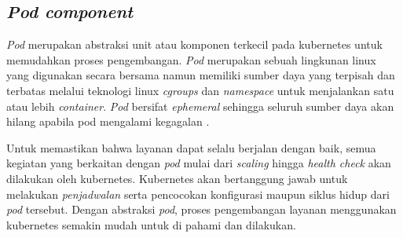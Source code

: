 \subsection{\textit{Pod component}}

\textit{Pod} merupakan abstraksi unit atau komponen terkecil pada kubernetes untuk memudahkan proses pengembangan. \textit{Pod} merupakan sebuah lingkunan linux yang digunakan secara bersama namun memiliki sumber daya yang terpisah dan terbatas melalui teknologi linux \textit{cgroups} dan \textit{namespace} untuk menjalankan satu atau lebih \textit{container}. \textit{Pod} bersifat \textit{ephemeral} sehingga seluruh sumber daya akan hilang apabila pod mengalami kegagalan \parencite{pod}.

Untuk memastikan bahwa layanan dapat selalu berjalan dengan baik, semua kegiatan yang berkaitan dengan \textit{pod} mulai dari \textit{scaling} hingga \textit{health check} akan dilakukan oleh kubernetes. Kubernetes akan bertanggung jawab untuk melakukan \textit{penjadwalan} serta pencocokan konfigurasi maupun siklus hidup dari \textit{pod} tersebut. Dengan abstraksi \textit{pod}, proses pengembangan layanan menggunakan kubernetes semakin mudah untuk di pahami dan dilakukan.
